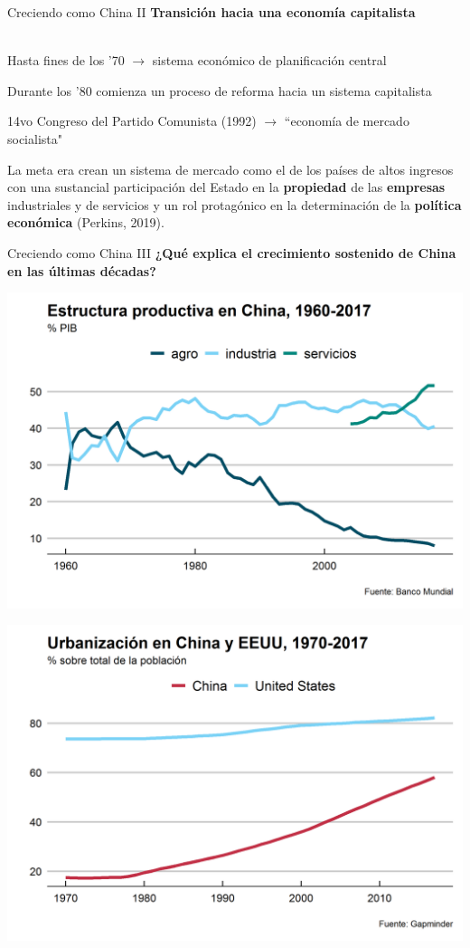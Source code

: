 \documentclass{beamer}
\let\tempone\itemize
\let\temptwo\enditemize
\renewenvironment{itemize}{\tempone\addtolength{\itemsep}{0.5\baselineskip}}{\temptwo}
\begin{document}
	\begin{frame}{Creciendo como China II}
		\textbf{Transición hacia una economía capitalista} \\~\\
		\begin{itemize}
			\item Hasta fines de los '70 $\rightarrow$ sistema económico de planificación central
			\item Durante los '80 comienza un proceso de reforma hacia un sistema capitalista
			\item 14vo Congreso del Partido Comunista (1992) $\rightarrow$ ``economía de mercado socialista"
			\item La meta era crean un sistema de mercado como el de los países de altos ingresos con una sustancial participación del Estado en la \textbf{propiedad} de las \textbf{empresas} industriales y de servicios y un rol protagónico en la determinación de la \textbf{política económica} (Perkins, 2019).
		\end{itemize}
	\end{frame}

	\begin{frame}[c]{Creciendo como China III}
		\textbf{¿Qué explica el crecimiento sostenido de China en las últimas décadas?}
	\end{frame}

	\begin{frame}[plain]
		\centering
		\includegraphics[width=.8\linewidth, keepaspectratio]{estr_prod_60}
	\end{frame}

	\begin{frame}[plain]
		\centering
		\includegraphics[width=.8\linewidth, keepaspectratio]{urban_70}
	\end{frame}
\end{document}
